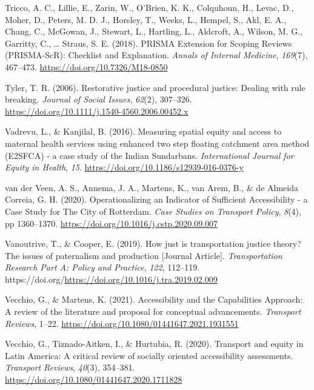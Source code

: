 \documentclass[
  letterpaper,
  DIV=11,
  numbers=noendperiod]{scrartcl}
\newlength{\cslhangindent}
\newenvironment{CSLReferences}[2] %
 {\begin{list}{}{%
  \setlength{\itemindent}{0pt}
  \setlength{\leftmargin}{0pt}
  \setlength{\parsep}{0pt}
  \ifodd #1
   \setlength{\leftmargin}{\cslhangindent}
   \setlength{\itemindent}{-1\cslhangindent}
  \fi
  \setlength{\itemsep}{#2\baselineskip}}}
 {\end{list}}
\begin{document}
\begin{CSLReferences}{1}{0}
Tricco, A. C., Lillie, E., Zarin, W., O'Brien, K. K., Colquhoun, H.,
Levac, D., Moher, D., Peters, M. D. J., Horsley, T., Weeks, L., Hempel,
S., Akl, E. A., Chang, C., McGowan, J., Stewart, L., Hartling, L.,
Aldcroft, A., Wilson, M. G., Garritty, C., \ldots{} Straus, S. E.
(2018). {PRISMA Extension} for {Scoping Reviews} ({PRISMA-ScR}):
{Checklist} and {Explanation}. \emph{Annals of Internal Medicine},
\emph{169}(7), 467--473. \url{https://doi.org/10.7326/M18-0850}

Tyler, T. R. (2006). Restorative justice and procedural justice: Dealing
with rule breaking. \emph{Journal of Social Issues}, \emph{62}(2),
307--326. \url{https://doi.org/10.1111/j.1540-4560.2006.00452.x}

Vadrevu, L., \& Kanjilal, B. (2016). Measuring spatial equity and access
to maternal health services using enhanced two step floating catchment
area method ({E2SFCA}) - a case study of the {Indian Sundarbans}.
\emph{International Journal for Equity in Health}, \emph{15}.
\url{https://doi.org/10.1186/s12939-016-0376-y}

van der Veen, A. S., Annema, J. A., Martens, K., van Arem, B., \& de
Almeida Correia, G. H. (2020). Operationalizing an {Indicator} of
{Sufficient Accessibility} - a {Case Study} for {The City} of
{Rotterdam}. \emph{Case Studies on Transport Policy}, \emph{8}(4), pp
1360--1370. \url{https://doi.org/10.1016/j.cstp.2020.09.007}

Vanoutrive, T., \& Cooper, E. (2019). How just is transportation justice
theory? The issues of paternalism and production {[}Journal Article{]}.
\emph{Transportation Research Part A: Policy and Practice}, \emph{122},
112--119.
https://doi.org/\url{https://doi.org/10.1016/j.tra.2019.02.009}

Vecchio, G., \& Martens, K. (2021). Accessibility and the {Capabilities
Approach}: A review of the literature and proposal for conceptual
advancements. \emph{Transport Reviews}, 1--22.
\url{https://doi.org/10.1080/01441647.2021.1931551}

Vecchio, G., Tiznado-Aitken, I., \& Hurtubia, R. (2020). Transport and
equity in {Latin America}: A critical review of socially oriented
accessibility assessments. \emph{Transport Reviews}, \emph{40}(3),
354--381. \url{https://doi.org/10.1080/01441647.2020.1711828}


\end{CSLReferences}
\end{document}
